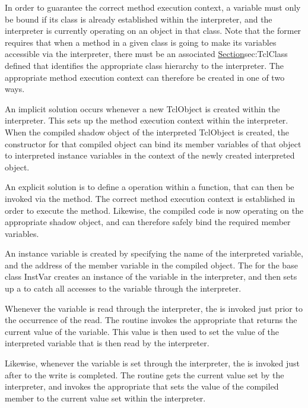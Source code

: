 In order to guarantee the correct method execution context,
a variable must only be bound if its class is already established within
the interpreter, and
the interpreter is currently operating on an object in that class.
Note that the former requires that when a method in a given class is
going to make its variables accessible via the interpreter,
there must be an associated 
\href{class TclClass}{Section}{sec:TclClass}
defined that identifies the appropriate class hierarchy to the interpreter.
The appropriate method execution context can therefore be created in one
of two ways.

An implicit solution occurs whenever a new TclObject is created within
the interpreter.
This sets up the method execution context within the interpreter.
When the compiled shadow object of the interpreted TclObject is created,
the constructor for that compiled object can bind its member variables
of that object
to interpreted instance variables in the context of the newly created
interpreted object.

An explicit solution is to define a  operation
within a  function, that can then be invoked via the
 method.
The correct method execution context is established in order to execute
the  method.
Likewise, the compiled code is now operating on the appropriate
shadow object, and can therefore safely bind the required member variables.

An instance variable is created by specifying the name of the
interpreted variable, and the address of the member variable in the
compiled object.
The
for the base class InstVar 
creates an instance of the variable in the interpreter,
and then sets up a
to  catch all accesses to the variable through the interpreter.

Whenever the variable is read through the interpreter, the
is invoked just prior to the occurrence of the read.
The routine invokes the appropriate
that returns the current value of the variable.
This value is then used to set the value of the interpreted variable
that is then read by the interpreter.

Likewise,
whenever the variable is set through the interpreter, the
is invoked just after to the write is completed.
The routine gets the current value set by the interpreter, 
and invokes the appropriate
that sets the value of the compiled member to the current value set
within the interpreter.

\endinput

### Local Variables:
### mode: latex
### comment-column: 60
### backup-by-copying-when-linked: t
### file-precious-flag: nil
### End:
